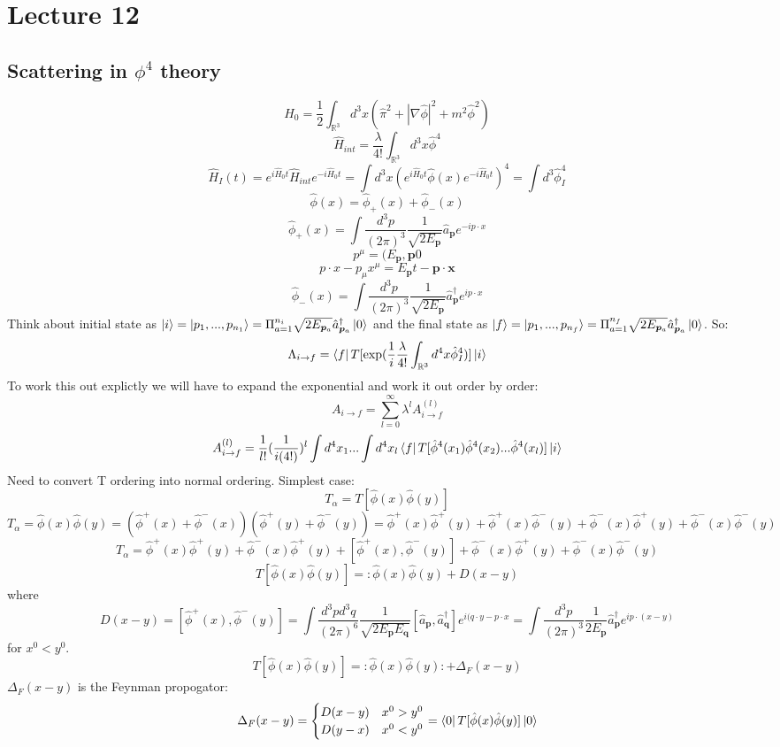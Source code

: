 \documentclass[12pt, a4paper, twoside, titlepage]{article}
\begin{document}
 \section{Lecture 12}
 \subsection{Scattering in $\phi^4$ theory}
$$
\hat H_0 = \frac{1}{2}\int_{\mathbb{R}^3} d^3x (\hat \pi^2 + |\nabla \hat \phi|^2 + m^2 \hat \phi^2)
$$
$$
\hat H_{int} = \frac{\lambda}{4!} \int_{\mathbb{R}^3} d^3x \hat \phi^4
$$
$$
\hat H_I(t) = e^{i\hat H_0 t} \hat H_{int} e^{-i\hat H_0 t} = \int d^3 x (e^{i\hat H_0 t} \hat \phi(x) e^{-i\hat H_0t })^4= \int d^3 \hat \phi_I^4 
$$
$$
\hat \phi(x) = \hat \phi_+ (x) + \hat \phi_- (x)
$$
$$
\hat \phi_+(x) = \int \frac{d^3 p}{(2\pi)^3} \frac{1}{\sqrt{2E_{\bm p}}} \hat a_{\bm p}e^{-ip \cdot x}
$$
$$
p^{\mu} = (E_{\bm p},\bm p0
$$
$$
p \cdot x - p_{\mu}x^{\mu} = E_{\bm p} t - \bm p \cdot \bm x
$$
$$
\hat \phi_-(x) = \int \frac{d^3 p}{(2\pi)^3} \frac{1}{\sqrt{2E_{\bm p}}} \hat a^{\dagger}_{\bm p}e^{ip \cdot x}
$$
Think about initial state as $\ket{i} = \ket{p_1, ..., p_{n_1}} = \Pi_{a=1}^{n_i} \sqrt{2 E_{\bm p_a}} \hat a^{\dagger}_{\bm p_a} \ket{0}$ and the final state as $\ket{f} = \ket{p_1, ..., p_{n_f}} = \Pi_{a=1}^{n_f} \sqrt{2 E_{\bm p_a}} \hat a^{\dagger}_{\bm p_a} \ket{0}$. So:
$$
\Lambda_{i \rightarrow f} = \bra{f} T[\exp(\frac{1}{i} \frac{\lambda}{4!} \int_{\mathbb{R}^3} d^4x \hat \phi_I^4)] \ket{i}
$$
To work this out explictly we will have to expand the exponential and work it out order by order:
$$
A_{i \rightarrow f} = \sum_{l=0}^{\infty} \lambda^l A_{i \rightarrow f}^{(l)}
$$
$$
A_{i \rightarrow f}^{(l)} = \frac{1}{l!}(\frac{1}{i(4!)})^l \int d^4 x_1 ... \int d^4 x_l
\bra{f} T[\hat \phi^4(x_1) \hat \phi^4(x_2) ... \hat \phi^4(x_l)] \ket{i}
$$
Need to convert T ordering into normal ordering. Simplest case:
$$
T_{\alpha} = T[\hat \phi(x) \hat \phi(y)]
$$
$$
T_{\alpha} = \hat \phi(x) \hat \phi(y) = (\hat \phi^+(x) + \hat \phi^-(x)) (\hat \phi^+(y) + \hat \phi^-(y)) = \hat \phi^+(x)\hat \phi^+(y) + \hat \phi^+(x)\hat \phi^-(y) + \hat \phi^-(x)\hat \phi^+(y) + \hat \phi^-(x)\hat \phi^-(y)
$$
$$
T_{\alpha} = \hat \phi^+(x)\hat \phi^+(y) + \hat \phi^-(x)\hat \phi^+(y) +[\hat \phi^+(x), \hat \phi^-(y)] + \hat \phi^-(x)\hat \phi^+(y) + \hat \phi^-(x)\hat \phi^-(y)
$$
$$
T[\hat \phi(x) \hat \phi(y)] = :\hat \phi(x) \hat \phi(y) + D(x-y)
$$
where $$
D(x-y) = [\hat \phi^+(x), \hat \phi^-(y)] = \int \frac{d^3 pd^3q}{(2\pi)^6} \frac{1}{\sqrt{2E_{\bm p}E_{\bm q}}} [\hat a_{\bm p},\hat a^{\dagger}_{\bm q}]e^{i(q\cdot y - p \cdot x} =  \int \frac{d^3 p}{(2\pi)^3} \frac{1}{2E_{\bm p}} \hat a^{\dagger}_{\bm p}e^{ip \cdot (x-y)}
$$
for $x^0 < y^0$.
\begin{equation}
        T[\hat \phi(x) \hat \phi(y)] = :\hat \phi(x) \hat \phi(y): + \Delta_F (x-y)
\end{equation}
$\Delta_F (x-y)$ is the Feynman propogator:
$$
        \Delta_F (x-y) = \begin{cases} D(x-y) & x^0 > y^0 \\
        D(y-x) & x^0 < y^0\end{cases} = \bra{0} T[\hat \phi(x) \hat \phi(y)] \ket{0}
$$
\end{document}
